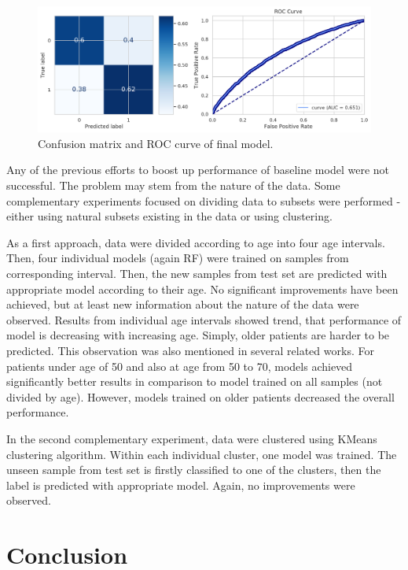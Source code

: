 \documentclass[runningheads]{llncs}
\begin{document}
\begin{figure}[h!]
    \centering
    \includegraphics[width=\linewidth]{figures/final_model.png}
    \caption{Confusion matrix and ROC curve of final model.}
    \label{fig:final-model-results}
\end{figure}

Any of the previous efforts to boost up performance of baseline model were not successful. The problem may stem from the nature of the data. Some complementary experiments focused on dividing data to subsets were performed - either using natural subsets existing in the data or using clustering.

As a first approach, data were divided according to age into four age intervals. Then, four individual models (again RF) were trained on samples from corresponding interval. Then, the new samples from test set are predicted with appropriate model according to their age. No significant improvements have been achieved, but at least new information about the nature of the data were observed. Results from individual age intervals showed trend, that performance of model is decreasing with increasing age. Simply, older patients are harder to be predicted. This observation was also mentioned in several related works. For patients under age of 50 and also at age from 50 to 70, models achieved significantly better results in comparison to model trained on all samples (not divided by age). However, models trained on older patients decreased the overall performance.

In the second complementary experiment, data were clustered using KMeans clustering algorithm. Within each individual cluster, one model was trained. The unseen sample from test set is firstly classified to one of the clusters, then the label is predicted with appropriate model. Again, no improvements were observed.


\section{Conclusion}
\end{document}
